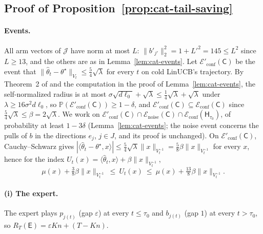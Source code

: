 \documentclass{article}
\theoremstyle{definition}
\theoremstyle{remark}
\newcommand{\Prb}{\mathbb{P}}
\newcommand{\eps}{\varepsilon}
\theoremstyle{remark}
\newcommand{\Cold}{\mathsf{C}}
\newcommand{\Exp}{\mathsf{E}}
\newcommand{\Hyb}{\mathsf{H}}
\begin{document}
\subsection{Proof of Proposition~\ref{prop:cat-tail-saving}}
\label{app:proof-tail-saving}

\paragraph{Events.}
All arm vectors of $\mathcal J$ have norm at most $L$: $\|b'_{j'}\|_2^2=1+L'^2=145\le L^2$
since $L\ge13$, and the others are as in Lemma~\ref{lem:cat-events}. Let
$\mathcal E'_{\mathrm{conf}}(\Cold)$ be the event that
$\|\widehat\theta_t-\theta^\star\|_{V_t}\le\tfrac54\sqrt\lambda$ for every $t$
on cold LinUCB's trajectory. By Theorem~2 of \cite{abbasi2011improved} and
the computation in the proof of Lemma~\ref{lem:cat-events}, the
self-normalized radius is at most $\sigma\sqrt{d\ell_0}+\sqrt\lambda\le\tfrac14\sqrt\lambda+\sqrt\lambda$
under $\lambda\ge16\sigma^2d\ell_0$, so
$\Prb(\mathcal E'_{\mathrm{conf}}(\Cold))\ge1-\delta$, and
$\mathcal E'_{\mathrm{conf}}(\Cold)\subseteq\mathcal E_{\mathrm{conf}}(\Cold)$
since $\tfrac54\sqrt\lambda\le\beta=2\sqrt\lambda$. We work on
$\mathcal E'_{\mathrm{conf}}(\Cold)\cap\mathcal E_{\mathrm{noise}}(\Cold)\cap\mathcal E_{\mathrm{conf}}(\Hyb_{\tau_0})$,
of probability at least $1-3\delta$ (Lemma~\ref{lem:cat-events}; the noise
event concerns the pulls of $b$ in the directions $e_j$, $j\in J$, and its
proof is unchanged). On $\mathcal E'_{\mathrm{conf}}(\Cold)$, Cauchy--Schwarz
gives $|\langle\widehat\theta_t-\theta^\star,x\rangle|\le\tfrac54\sqrt\lambda\|x\|_{V_t^{-1}}=\tfrac58\beta\|x\|_{V_t^{-1}}$
for every $x$, hence for the index $U_t(x)=\langle\widehat\theta_t,x\rangle+\beta\|x\|_{V_t^{-1}}$,
\begin{equation}
\label{eq:sharp-index}
\mu(x)+\tfrac38\beta\|x\|_{V_t^{-1}}\ \le\ U_t(x)\ \le\ \mu(x)+\tfrac{13}8\beta\|x\|_{V_t^{-1}} .
\end{equation}

\paragraph{(i) The expert.}
The expert plays $p_{j(t)}$ (gap $\eps$) at every $t\le\tau_0$ and $b_{j(t)}$
(gap $1$) at every $t>\tau_0$, so $R_T(\Exp)=\eps Kn+(T-Kn)$.
\end{document}
